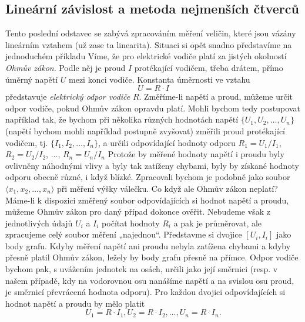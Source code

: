     \subsection{Lineární závislost a metoda nejmenších čtverců}
      Tento poslední odstavec se zabývá zpracováním měření veličin, které jsou vázány lineárním
      vztahem (už zase ta linearita). Situaci si opět snadno představíme na jednoduchém příkladu
      Víme, že pro elektrické vodiče platí za jistých okolností \emph{Ohmův zákon}. Podle něj je 
      proud \(I\) protékající vodičem, třeba drátem, přímo úměrný napětí \(U\) mezi konci vodiče. 
      Konstanta úměrnosti ve vztahu
      \begin{equation*}
        U = R\cdot I
      \end{equation*}
      představuje \emph{elektrický odpor vodiče} \(R\). Změříme-li napětí a proud, můžeme určit 
      odpor vodiče, pokud Ohmův zákon opravdu platí. Mohli bychom tedy postupovat například tak, že 
      bychom při několika různých hodnotách napětí \(\lbrace U_1, U_2, \ldots, U_n \rbrace\) 
      (napětí bychom mohli například postupně zvyšovat) změřili proud protékající vodičem, tj. 
      \(\lbrace I_1, I_2, \ldots, I_n \rbrace\), a určili odpovídající hodnoty odporu \(R_1 = 
      U_1/I_1\), \(R_2 = U_2/I_2\), \(\ldots\), \(R_n = U_n/I_n\)  Protože by měřené hodnoty napětí 
      i proudu byly ovlivněny náhodnými vlivy a byly tak zatíženy chybami, byly by získané hodnoty 
      odporu obecně různé, i když blízké. Zpracovali bychom je podobně jako soubor \(\langle x_1, 
      x_2, \ldots, x_n \rangle\) při měření výšky válečku. Co když ale Ohmův zákon neplatí? Máme-li 
      k dispozici změřený soubor odpovídajících si hodnot napětí a proudu, můžeme Ohmův zákon pro 
      daný případ dokonce ověřit. Nebudeme však z jednotlivých údajů \(U_i\) a \(I_i\) počítat 
      hodnoty \(R_i\) a pak je průměrovat, ale zpracujeme celý soubor měření „najednou“. Představme 
      si dvojice \([U_i, I_i]\) jako body grafu. Kdyby měření napětí ani proudu nebyla zatížena 
      chybami a kdyby přesně platil Ohmův zákon, ležely by body grafu přesně na přímce. Odpor 
      vodiče bychom pak, s uvážením jednotek na osách, určili jako její směrnici (resp. v našem 
      případě, kdy na vodorovnou osu nanášíme napětí a na svislou osu proud, je směrnicí převrácená 
      hodnota odporu). Pro každou dvojici odpovídajících si hodnot napětí a proudu by mělo platit
      \begin{equation*}
        U_1 = R\cdot I_1, U_2 = R\cdot I_2, \ldots, U_n = R\cdot I_n.
      \end{equation*}

